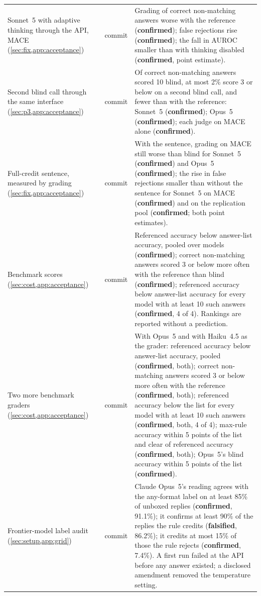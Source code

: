 {\begin{longtable}{L{3.2cm}L{1.1cm}L{8.7cm}}
Sonnet~5 with adaptive thinking through the API, \textsc{MACE} (\cref{sec:fix,app:acceptance}) & commit & Grading of correct non-matching answers worse with the reference (\textbf{confirmed}); false rejections rise (\textbf{confirmed}); the fall in AUROC smaller than with thinking disabled (\textbf{confirmed}, point estimate). \\
Second blind call through the same interface (\cref{sec:p3,app:acceptance}) & commit & Of correct non-matching answers scored 10 blind, at most 2\% score 3 or below on a second blind call, and fewer than with the reference: Sonnet~5 (\textbf{confirmed}); Opus~5 (\textbf{confirmed}); each judge on \textsc{MACE} alone (\textbf{confirmed}). \\
Full-credit sentence, measured by grading (\cref{sec:fix,app:acceptance}) & commit & With the sentence, grading on \textsc{MACE} still worse than blind for Sonnet~5 (\textbf{confirmed}) and Opus~5 (\textbf{confirmed}); the rise in false rejections smaller than without the sentence for Sonnet~5 on \textsc{MACE} (\textbf{confirmed}) and on the replication pool (\textbf{confirmed}; both point estimates). \\
Benchmark scores (\cref{sec:cost,app:acceptance}) & commit & Referenced accuracy below answer-list accuracy, pooled over models (\textbf{confirmed}); correct non-matching answers scored 3 or below more often with the reference than blind (\textbf{confirmed}); referenced accuracy below answer-list accuracy for every model with at least 10 such answers (\textbf{confirmed}, 4 of 4). Rankings are reported without a prediction. \\
Two more benchmark graders (\cref{sec:cost,app:acceptance}) & commit & With Opus~5 and with Haiku~4.5 as the grader: referenced accuracy below answer-list accuracy, pooled (\textbf{confirmed}, both); correct non-matching answers scored 3 or below more often with the reference (\textbf{confirmed}, both); referenced accuracy below the list for every model with at least 10 such answers (\textbf{confirmed}, both, 4 of 4); max-rule accuracy within 5 points of the list and clear of referenced accuracy (\textbf{confirmed}, both); Opus~5's blind accuracy within 5 points of the list (\textbf{confirmed}). \\
Frontier-model label audit (\cref{sec:setup,app:grid}) & commit & Claude Opus~5's reading agrees with the any-format label on at least 85\% of unboxed replies (\textbf{confirmed}, 91.1\%); it confirms at least 90\% of the replies the rule credits (\textbf{falsified}, 86.2\%); it credits at most 15\% of those the rule rejects (\textbf{confirmed}, 7.4\%). A first run failed at the API before any answer existed; a disclosed amendment removed the temperature setting. \\

\end{longtable}}
